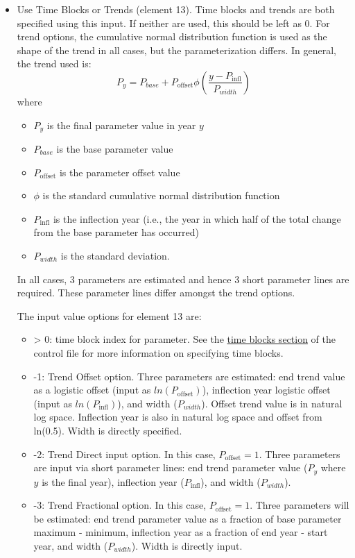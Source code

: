 \begin{itemize}
\item Use Time Blocks or Trends (element 13). Time blocks and trends are both specified using this input. If neither are used, this should be left as 0. For trend options, the cumulative normal distribution function is used as the shape of the trend in all cases, but the parameterization differs. In general, the trend used is: 
    \begin{equation}
	    P_y = P_{base} + P_{\text{offset}}\phi(\frac{y - P_{\text{infl}}}{P_{width}})
	\end{equation}
	where
	\begin{itemize} 
	    \item $P_y$ is the final parameter value in year $y$
		\item $P_{base}$ is the base parameter value
		\item $P_{\text{offset}}$ is the parameter offset value
		\item $\phi$ is the standard cumulative normal distribution function
		\item $P_{\text{infl}}$ is the inflection year (i.e., the year in which half of the total change from the base parameter has occurred)
		\item $P_{width}$ is the standard deviation.
	\end{itemize}
In all cases, 3 parameters are estimated and hence 3 short parameter lines are required. These parameter lines differ amongst the trend options.

The input value options for element 13 are:
	\begin{itemize}
		\item > 0: time block index for parameter. See the \hyperlink{timeblocks}{time blocks section} of the control file for more information on specifying time blocks.
		\item -1: Trend Offset option. Three parameters are estimated: end trend value as a logistic offset (input as $ln(P_{\text{offset}})$), inflection year logistic offset (input as $ln(P_{\text{infl}})$), and width ($P_{width}$). Offset trend value is in natural log space. Inflection year is also in natural log space and offset from ln(0.5). Width is directly specified.
		\item -2: Trend Direct input option. In this case, $P_{\text{offset}} = 1$. Three parameters are input via short parameter lines: end trend parameter value ($P_y$ where $y$ is the final year), inflection year ($P_{\text{infl}}$), and width ($P_{width}$). 
		\item -3: Trend Fractional option. In this case, $P_{\text{offset}} = 1$. Three parameters will be estimated: end trend parameter value as a fraction of base parameter maximum - minimum, inflection year as a fraction of end year - start year, and width ($P_{width}$). Width is directly input.
	\end{itemize}
	

\end{itemize}
